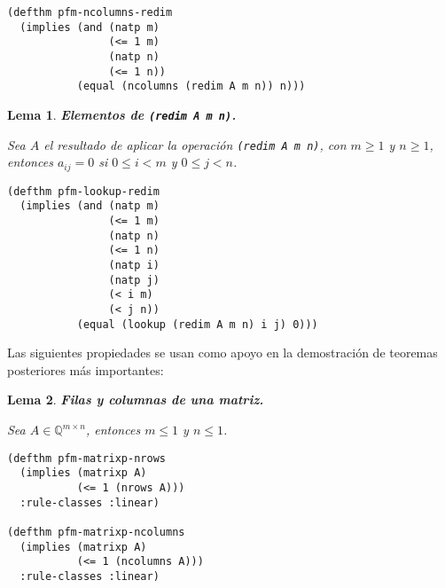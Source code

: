 \documentclass[a4paper,10pt]{article}
\newcommand{\M}[3]{#1 \in \mathbb{Q}^{#2 \times #3}}
\newtheorem{lema}{{Lema}}
\begin{document}
\begin{lstlisting}[language=clips]
(defthm pfm-ncolumns-redim
  (implies (and (natp m)
                (<= 1 m)
                (natp n)
                (<= 1 n))
           (equal (ncolumns (redim A m n)) n)))
\end{lstlisting}

\par \vspace{16pt}

\begin{lema} \textbf{Elementos de \texttt{(redim A m n)}.}\vspace{8pt}\par
Sea $A$ el resultado de aplicar la operación \texttt{(redim A m n)}, con $m \geq 1$ y $n \geq 1$, entonces $a_{ij} = 0$ si $0 \leq i < m$ y $0 \leq j < n$. 
\end{lema}

\begin{lstlisting}[language=clips]
(defthm pfm-lookup-redim
  (implies (and (natp m)
                (<= 1 m)
                (natp n)
                (<= 1 n)
                (natp i)
                (natp j)
                (< i m)
                (< j n))
           (equal (lookup (redim A m n) i j) 0)))
\end{lstlisting}

\par \vspace{16pt}

Las siguientes propiedades se usan como apoyo en la demostración de teoremas posteriores más importantes:

\par \vspace{16pt}

\begin{lema} \textbf{Filas y columnas de una matriz.}\vspace{8pt}\par
Sea $\M{A}{m}{n}$, entonces $m \leq 1$ y $n \leq 1$. 
\end{lema}

\begin{lstlisting}[language=clips]
(defthm pfm-matrixp-nrows
  (implies (matrixp A)
           (<= 1 (nrows A)))
  :rule-classes :linear)

(defthm pfm-matrixp-ncolumns
  (implies (matrixp A)
           (<= 1 (ncolumns A)))
  :rule-classes :linear)
\end{lstlisting}

\par \vspace{16pt}
\end{document}
